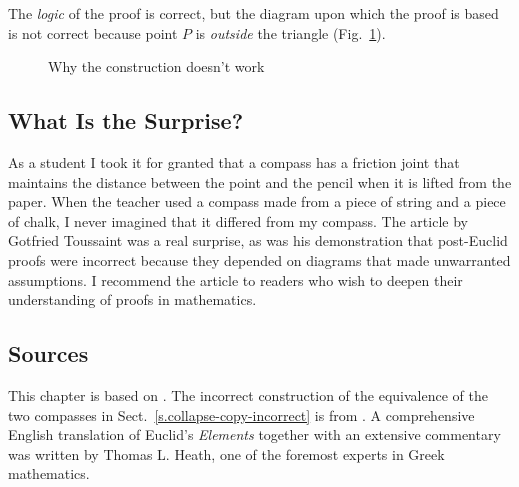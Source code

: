 The \emph{logic} of the proof is correct, but the diagram upon which the proof is based is not correct because point $P$ is \emph{outside} the triangle (Fig.~\ref{f.collapse-isoceles-2}).

\begin{figure}[b]
\begin{center}
\vspace{-2ex}
\caption{Why the construction doesn't work}\label{f.collapse-isoceles-2}
\end{center}
\end{figure}

\newpage

\subsection*{What Is the Surprise?}

As a student I took it for granted that a compass has a friction joint that maintains the distance between the point and the pencil when it is lifted from the paper. When the teacher used a compass made from a piece of string and a piece of chalk, I never imagined that it differed from my compass. The article by Gotfried Toussaint was a real surprise, as was his demonstration that post-Euclid proofs were incorrect because they depended on diagrams that made unwarranted assumptions. I recommend the article to readers who wish to deepen their understanding of  proofs in mathematics.

\subsection*{Sources}

This chapter is based on \cite{toussaint}. The incorrect construction of the equivalence of the two compasses in Sect.~\ref{s.collapse-copy-incorrect} is from \cite{rusty}. A comprehensive English translation of Euclid's \textit{Elements} together with an extensive commentary \cite{euclid} was written by Thomas L. Heath, one of the foremost experts in Greek mathematics.
